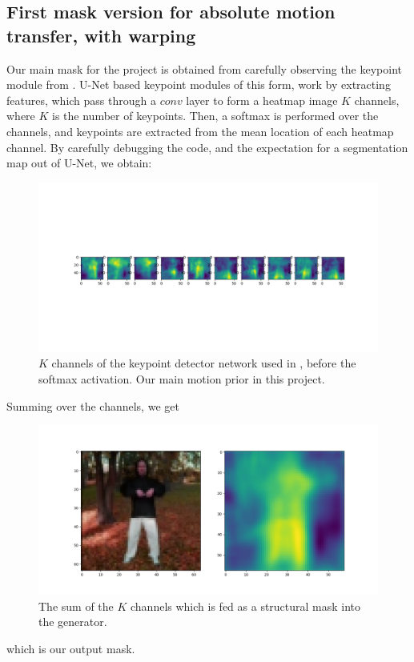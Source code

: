 \documentclass{article}
\begin{document}
\subsection{First mask version for absolute motion transfer, with warping}
Our main mask for the project is obtained from carefully observing the
keypoint module from \cite{siarohin2020animating}. U-Net based keypoint
modules of this form, work by extracting features, which pass through a
$\textit{conv}$ layer to form a heatmap image $K$ channels, where $K$ is the
number of keypoints. Then, a softmax is performed over the channels, and
keypoints are extracted from the mean location of each heatmap channel.
By carefully debugging the code, and the expectation for a segmentation map
out of U-Net, we obtain:
\begin{figure}[ht]
\vskip 0.2in
\begin{center}
\centerline{\includegraphics[width=\columnwidth]{mask_10kp}}
\caption{
$K$ channels of the keypoint detector network used in
\cite{siarohin2020order}, before the softmax activation. Our main motion
prior in this project.
}
\label{mask-10kp}
\end{center}
\vskip -0.2in
\end{figure}

Summing over the channels, we get

\begin{figure}[ht]
\vskip 0.2in
\begin{center}
\centerline{\includegraphics[width=\columnwidth]{mask_sum}}
\caption{
The sum of the $K$ channels which is fed as a structural mask into the
generator.
}
\label{mask-sum}
\end{center}
\vskip -0.2in
\end{figure}
which is our output mask.
\end{document}
